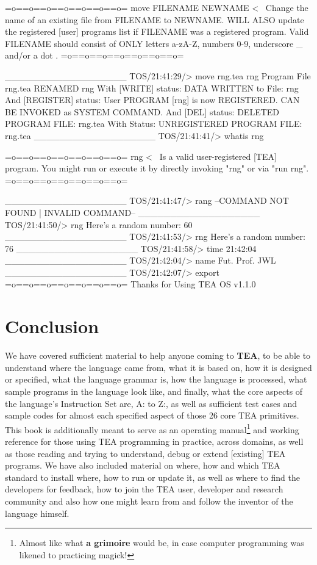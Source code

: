 \documentclass[a4paper, 18pt]{book} %
\begin{document}
{{{\begin{tcbverbatim}[title=Sample OUTPUT 1 from TEA OS v1.1.0]
=o==o==o==o==o==o==o=
move FILENAME NEWNAME <~ Change the name of an existing file from FILENAME to NEWNAME. WILL ALSO update the registered [user] programs list if FILENAME was a registered program. Valid FILENAME should consist of ONLY letters a-zA-Z, numbers 0-9, underscore _ and/or a dot .
=o==o==o==o==o==o==o=

___________________
TOS/21:41:29/> 
move rng.tea rng
Program File rng.tea RENAMED  rng
With [WRITE] status: DATA WRITTEN to File: rng
And [REGISTER] status: User PROGRAM [rng] is now REGISTERED.
CAN BE INVOKED as SYSTEM COMMAND.
And [DEL] status: DELETED PROGRAM FILE: rng.tea
With Status: UNREGISTERED PROGRAM FILE: rng.tea
___________________
TOS/21:41:41/> 
whatis rng

=o==o==o==o==o==o==o=
rng <~ Is a valid user-registered [TEA] program. You might run or execute it by directly invoking "rng" or via "run rng".
=o==o==o==o==o==o==o=

___________________
TOS/21:41:47/> 
rang
--COMMAND NOT FOUND | INVALID COMMAND--
___________________
TOS/21:41:50/> 
rng
Here's a random number: 60
___________________
TOS/21:41:53/> 
rng
Here's a random number: 76
___________________
TOS/21:41:58/> 
time
21:42:04
___________________
TOS/21:42:04/> 
name
Fut. Prof. JWL
___________________
TOS/21:42:07/> 
export
=o==o==o==o==o==o==o=
Thanks for Using TEA OS v1.1.0
  \end{tcbverbatim}
 \vspace{2em}





\chapter{Conclusion}
\label{SECCONC}



We have covered sufficient material to help anyone coming to \textbf{TEA}, to be able to understand where the language came from, what it is based on, how it is designed or specified, what the language grammar is, how the language is processed, what sample programs in the language look like, and finally, what the core aspects of the language's Instruction Set are, A: to Z:, as well as sufficient test cases and sample codes for almost each specified aspect of those 26 core TEA primitives. This book is additionally meant to serve as an operating manual\footnote{Almost like what \textbf{a grimoire} would be, in case computer programming was likened to practicing magick!} and working reference for those using TEA programming in practice, across domains, as well as those reading and trying to understand, debug or extend [existing] TEA programs. We have also included material on where, how and which TEA standard to install where, how to run or update it, as well as where to find the developers for feedback, how to join the TEA user, developer and research community and also how one might learn from and follow the inventor of the language himself.



}}}
\end{document}
